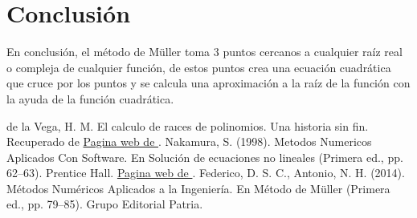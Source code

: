 \documentclass[12pt]{article}
\begin{document}
		\section*{\centering Conclusión}\label{sec:Conclusion}
			En conclusión, el método de Müller toma 3 puntos cercanos a cualquier raíz real o compleja de 
			cualquier función, de estos puntos crea una ecuación cuadrática que cruce por los puntos y se 
			calcula una aproximación a la raíz de la función con la ayuda de la función cuadrática.\\

		\centering
		\begin{thebibliography}{10}
			 de la Vega, H. M. El calculo de raıces de polinomios. Una historia sin fin. Recuperado de
							\href{http://www.matedu.cinvestav.mx/~elcalculoysuensenanza/investigacion/articulosPDF/Madrid.pdf}{Pagina web de \cite{bib:item1}}.
			 Nakamura, S. (1998). Metodos Numericos Aplicados Con Software. En Solución de ecuaciones no lineales (Primera ed., pp. 62–63). Prentice Hall.
							\href{https://bibliotecadigital.univalle.edu.co/bitstream/handle/10893/21225/CB%200525927-3487.pdf?sequence=1&isAllowed=y}{Pagina web de \cite{bib:item3}}.
				Federico, D. S. C., Antonio, N. H. (2014). Métodos Numéricos Aplicados a la Ingeniería. En Método de Müller (Primera ed., pp. 79–85). Grupo Editorial Patria.
		\end{thebibliography}

	
\end{document}
